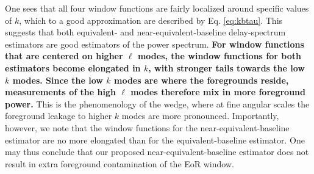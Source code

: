 \documentclass[twocolumn,apj,numberedappendix]{emulateapj}
\renewcommand\[{\begin{equation}}
\renewcommand\]{\end{equation}}
\begin{document}
One sees that all four window functions are fairly localized around specific values of $k$, which to a good approximation are described by Eq. \eqref{eq:kbtau}. This suggests that both equivalent- and near-equivalent-baseline delay-spectrum estimators are good estimators of the power spectrum. \textbf{For window functions that are centered on higher $\ell$ modes, the window functions for both estimators become elongated in $k$, with stronger tails towards the low $k$ modes. Since the low $k$ modes are where the foregrounds reside, measurements of the high $\ell$ modes therefore mix in more foreground power.} This is the phenomenology of the wedge, where at fine angular scales the foreground leakage to higher $k$ modes are more pronounced. Importantly, however, we note that the window functions for the near-equivalent-baseline estimator are no more elongated than for the equivalent-baseline estimator. One may thus conclude that our proposed near-equivalent-baseline estimator does not result in extra foreground contamination of the EoR window.

\end{document}

